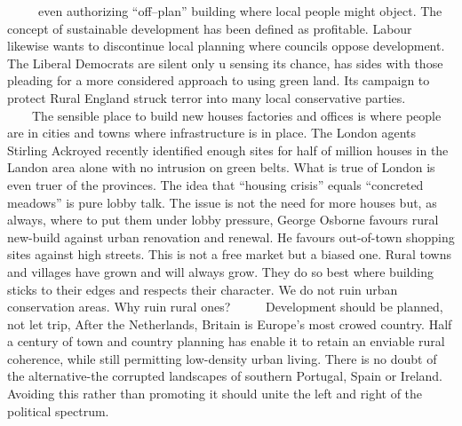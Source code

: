  　　even authorizing “off–plan” building where local people might object. The concept of sustainable development has been defined as profitable. Labour likewise wants to discontinue local planning where councils oppose development. The Liberal Democrats are silent only u sensing its chance, has sides with those pleading for a more considered approach to using green land. Its campaign to protect Rural England struck terror into many local conservative parties.  
 　　The sensible place to build new houses factories and offices is where people are in cities and towns where infrastructure is in place. The London agents Stirling Ackroyed recently identified enough sites for half of million houses in the Landon area alone with no intrusion on green belts. What is true of London is even truer of the provinces. The idea that “housing crisis” equals “concreted meadows” is pure lobby talk. The issue is not the need for more houses but, as always, where to put them under lobby pressure, George Osborne favours rural new-build against urban renovation and renewal. He favours out-of-town shopping sites against high streets. This is not a free market but a biased one. Rural towns and villages have grown and will always grow. They do so best where building sticks to their edges and respects their character. We do not ruin urban conservation areas. Why ruin rural ones? 
　　Development should be planned, not let trip, After the Netherlands, Britain is Europe’s most crowed country. Half a century of town and country planning has enable it to retain an enviable rural coherence, while still permitting low-density urban living. There is no doubt of the alternative-the corrupted landscapes of southern Portugal, Spain or Ireland. Avoiding this rather than promoting it should unite the left and right of the political spectrum.
